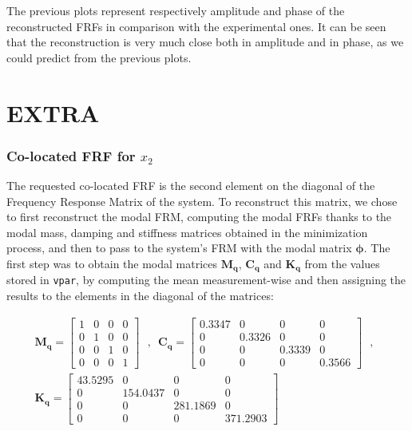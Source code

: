 \documentclass[a4paper,12pt,oneside]{article}
\begin{document}
The previous plots represent respectively amplitude and phase of the reconstructed FRFs in comparison with the experimental ones.
It can be seen that the reconstruction is very much close both in amplitude and in phase, as we could predict from the previous plots.


\part*{EXTRA}

\section{Co-located FRF for $ x_2 $}
\label{sec:co-located_point2}

The requested co-located FRF is the second element on the diagonal of the Frequency Response Matrix of the system. To reconstruct this matrix, we chose to first reconstruct the modal FRM, computing the modal FRFs thanks to the modal mass, damping and stiffness matrices obtained in the minimization process, and then to pass to the system's FRM with the modal matrix $ \bm{\phi} $. The first step was to obtain the modal matrices $ \mathbf{M_q} $, $ \mathbf{C_q} $ and $ \mathbf{K_q} $ from the values stored in \lstinline!vpar!, by computing the mean measurement-wise and then assigning the results to the elements in the diagonal of the matrices:

\[ \begin{split}
	\mathbf{M_q} =	\begin{bmatrix}
										1	& 0	& 0	& 0 \\
										0	& 1	& 0	& 0 \\
										0	& 0	& 1	& 0 \\
										0	& 0	& 0	& 1
									\end{bmatrix} \text{~ , ~}
		\mathbf{C_q} =	\begin{bmatrix}
											0.3347	& 0				& 0				& 0 \\
											0				& 0.3326	& 0				& 0 \\
											0				& 0				& 0.3339	& 0 \\
											0				& 0				& 0				& 0.3566
										\end{bmatrix} \text{~ , ~} \\[10pt]
	\mathbf{K_q} =	\begin{bmatrix}
										43.5295	& 0					& 0					& 0 \\
										0				& 154.0437	& 0					& 0 \\
										0				& 0					& 281.1869	& 0 \\
										0				& 0					& 0					& 371.2903
									\end{bmatrix}
\end{split} \]
\end{document}
